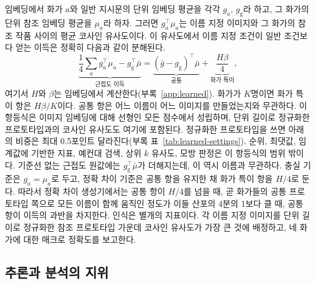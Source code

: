 \documentclass[10pt]{article}
\begin{document}
임베딩에서 화가 $a$와 일반 지시문의 단위 임베딩 평균을 각각 $g_a$, $g_{\mathrm{g}}$라 하고, 그 화가의
단위 참조 임베딩 평균을 $\mu_a$라 하자. 그러면 $g_a^\top\mu_a$는 이름 지정 이미지와 그 화가의 참조 작품
사이의 평균 코사인 유사도이다. 이 유사도에서 이름 지정 조건이 일반 조건보다 얻는 이득은 정확히 다음과
같이 분해된다.
\begin{equation}
\underbrace{\frac14\sum_a g_a^\top\mu_a-g_{\mathrm{g}}^\top\bar\mu}_{\text{근접도 이득}}
=\underbrace{(\bar g-g_{\mathrm{g}})^\top\bar\mu}_{\text{공통}}
+\underbrace{\frac{H\beta}{4}}_{\text{화가 특이}},
\label{eq:prototype-gain}
\end{equation}
여기서 $H$와 $\beta$는 임베딩에서 계산한다(부록~\ref{app:learned}). 화가가 $K$명이면 화가 특이 항은
$H\beta/K$이다. 공통 항은 어느 이름이 어느 이미지를 만들었는지와 무관하다. 이 항등식은 이미지 임베딩에
대해 선형인 모든 점수에서 성립하며, 단위 길이로 정규화한 프로토타입과의 코사인 유사도도 여기에 포함된다.
정규화한 프로토타입을 쓰면 아래의 비중은 최대 0.5포인트 달라진다(부록 표~\ref{tab:learned-settings}).
순위, 최댓값, 임계값에 기반한 지표, 예컨대 검색, 상위 $k$ 유사도, 모방 판정은 이 항등식의 범위 밖이다.
기준선 없는 근접도 원값에는 $g_{\mathrm{g}}^\top\bar\mu$가 더해지는데, 이 역시 이름과 무관하다. 충실
기준은 $g_a=\mu_a$로 두고, 정확 차이 기준은 공통 항을 유지한 채 화가 특이 항을 $H/4$로 둔다. 따라서
정확 차이 생성기에서는 공통 항이 $H/4$를 넘을 때, 곧 화가들의 공통 프로토타입 쪽으로 모든 이름이 함께
움직인 정도가 이들 산포의 4분의 1보다 클 때, 공통 항이 이득의 과반을 차지한다. 인식은 별개의
지표이다. 각 이름 지정 이미지를 단위 길이로 정규화한 참조 프로토타입 가운데 코사인 유사도가 가장 큰
것에 배정하고, 네 화가에 대한 매크로 정확도를 보고한다.

\subsection{추론과 분석의 지위}\label{sec:inference}
\end{document}
